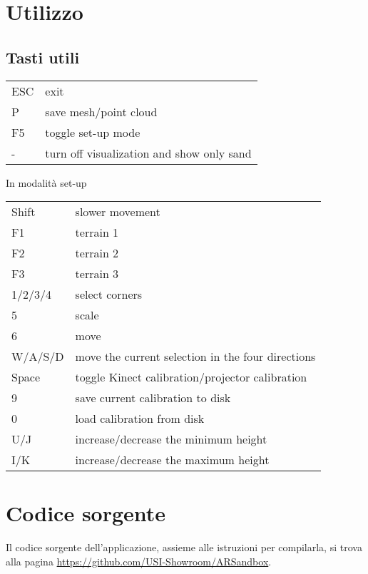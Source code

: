 \documentclass[12pt]{article}
\begin{document}
		
\newpage
\section{Utilizzo}

	\subsection{Tasti utili}
	
	\begin{tabular}{l l}
		ESC & exit\\
		P & save mesh/point cloud\\
		F5 & toggle set-up mode\\
		- & turn off visualization and show only sand\\
	\end{tabular}

	In modalità set-up

	\begin{tabular}{l l}
		Shift & slower movement\\

		F1 & terrain 1\\
		F2 & terrain 2\\
		F3 & terrain 3\\

		1/2/3/4 & select corners\\
		5 & scale\\
		6 & move\\

		W/A/S/D & move the current selection in the four directions\\

		Space & toggle Kinect calibration/projector calibration\\

		9 & save current calibration to disk\\
		0 & load calibration from disk\\

		U/J & increase/decrease the minimum height\\
		I/K & increase/decrease the maximum height\\
	\end{tabular}
		
		
\section{Codice sorgente}

	Il codice sorgente dell'applicazione, assieme alle istruzioni per compilarla, si trova alla pagina \url{https://github.com/USI-Showroom/ARSandbox}.
		
	
\end{document}
